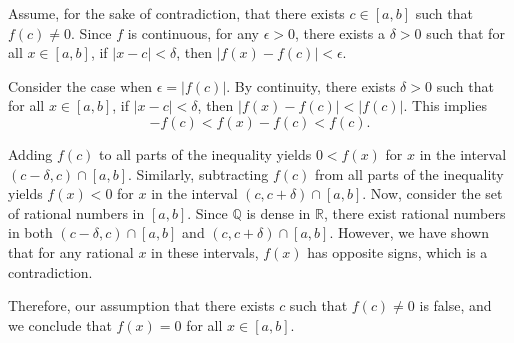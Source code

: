 \documentclass{report}
\begin{document}
Assume, for the sake of contradiction, that there exists $c \in[a, b]$ such that $f(c) \neq 0$. Since $f$ is continuous, for any $\epsilon>0$, there exists a $\delta>0$ such that for all $x \in[a, b]$, if $|x-c|<\delta$, then $|f(x)-f(c)|<\epsilon$.

Consider the case when $\epsilon=|f(c)|$. By continuity, there exists $\delta>0$ such that for all $x \in[a, b]$, if $|x-c|<\delta$, then $|f(x)-f(c)|<|f(c)|$. This implies
$$
-f(c)<f(x)-f(c)<f(c) .
$$

Adding $f(c)$ to all parts of the inequality yields $0<f(x)$ for $x$ in the interval $(c-\delta, c) \cap[a, b]$. Similarly, subtracting $f(c)$ from all parts of the inequality yields $f(x)<0$ for $x$ in the interval $(c, c+\delta) \cap[a, b]$. Now, consider the set of rational numbers in $[a, b]$. Since $\mathbb{Q}$ is dense in $\mathbb{R}$, there exist rational numbers in both $(c-\delta, c) \cap[a, b]$ and $(c, c+\delta) \cap[a, b]$. However, we have shown that for any rational $x$ in these intervals, $f(x)$ has opposite signs, which is a contradiction.

Therefore, our assumption that there exists $c$ such that $f(c) \neq 0$ is false, and we conclude that $f(x)=0$ for all $x \in[a, b]$.
\end{document}
